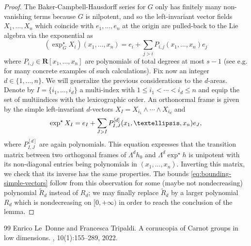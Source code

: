 \documentclass[10pt,a4paper]{amsart}
\begin{document}
\begin{proof}

The Baker-Campbell-Hausdorff series for $G$ only has finitely many non-vanishing terms because $G$ is nilpotent, and so the left-invariant vector fields $X_1,\ldots, X_n$ which coincide with $e_1, \ldots,e_n$ at the origin are pulled-back to the Lie algebra via the exponential as
\begin{equation}
\label{eq:bounding-simple-vectors-1}
     (\exp_G^\star X_i)(x_1,\ldots, x_n) = e_i + \sum_{j>i} P_{i,j}(x_1,\ldots, x_n) e_j 
\end{equation}
where $P_{i,j} \in \mathbf R[x_1,\ldots, x_n]$ are polynomials of total degrees at most $s -1$ (see e.g. \cite{LeDonneTripaldiCCLow} for many concrete examples of such calculations). 
Fix now an integer $d \in \{1,\ldots, n\}$. We will generalize the previous considerations to the $d$-areas. Denote by $I = \{i_1, \ldots, i_d \}$ a multi-index with $1 \leqslant i_1 < \cdots < i_d \leqslant n$ and equip the set of multiindices with the lexicographic order.  An orthonormal frame is given by the simple left-invariant $d$-vectors $X_I = X_{i_1} \wedge \cdots \wedge X_{i_d}$ and
\begin{equation}
     \operatorname{exp}^\star X_I = e_I + \sum_{J > I} P^{[d]}_{I,J}(x_1,\ldots, x_n) e_J, \notag
\end{equation}
where $P_{I,J}^{[d]}$ are again polynomials.
 This equation expresses that the transition matrix between two orthogonal frames of $\Lambda^d h_0$ and 
$\Lambda^d \exp^\star h$ is unipotent with its non-diagonal entries being polynomials in $(x_1, \ldots, x_n)$. Inverting this matrix, we check that its inverse has the same properties.
The bounds \eqref{eq:bounding-simple-vectors} follow from this observation for some (maybe not nondecreasing) polynomial $\widetilde R_d$ instead of $R_d$; we may finally replace $\widetilde R_d$ by a larger polynomial $R_d$ which is nondecreasing on $[0,+\infty)$ in order to reach the conclusion of the lemma.
\end{proof}

\begin{thebibliography}{99}
 Enrico Le~Donne and Francesca Tripaldi. \newblock A cornucopia of {C}arnot groups in low dimensions. , 10(1):155--289, 2022.
\end{thebibliography}
\end{document}
